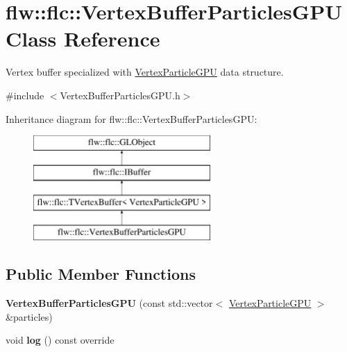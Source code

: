 \hypertarget{classflw_1_1flc_1_1VertexBufferParticlesGPU}{}\section{flw\+:\+:flc\+:\+:Vertex\+Buffer\+Particles\+G\+PU Class Reference}
\label{classflw_1_1flc_1_1VertexBufferParticlesGPU}


Vertex buffer specialized with \hyperlink{structflw_1_1flc_1_1VertexParticleGPU}{Vertex\+Particle\+G\+PU} data structure.  




{\ttfamily \#include $<$Vertex\+Buffer\+Particles\+G\+P\+U.\+h$>$}

Inheritance diagram for flw\+:\+:flc\+:\+:Vertex\+Buffer\+Particles\+G\+PU\+:\begin{figure}[H]
\begin{center}
\leavevmode
\includegraphics[height=4.000000cm]{classflw_1_1flc_1_1VertexBufferParticlesGPU}
\end{center}
\end{figure}
\subsection*{Public Member Functions}
\begin{DoxyCompactItemize}
\item 
\mbox{\label{classflw_1_1flc_1_1VertexBufferParticlesGPU_a44d4c2566fb3b24c384349459b5501ff}} 
{\bfseries Vertex\+Buffer\+Particles\+G\+PU} (const std\+::vector$<$ \hyperlink{structflw_1_1flc_1_1VertexParticleGPU}{Vertex\+Particle\+G\+PU} $>$ \&particles)
\item 
\mbox{\label{classflw_1_1flc_1_1VertexBufferParticlesGPU_a01750a1530713cb75bb1267977068c6a}} 
void {\bfseries log} () const override
\end{DoxyCompactItemize}
